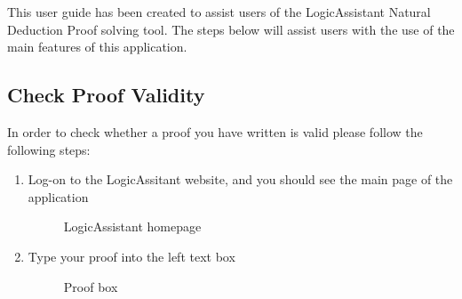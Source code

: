  
This user guide has been created to assist users of the LogicAssistant Natural Deduction Proof solving tool. The steps below will assist users with the use of the main features of this application.

\subsection{Check Proof Validity}

In order to check whether a proof you have written is valid please follow the following steps:

\begin{enumerate}
	\item Log-on to the LogicAssitant website, and you should see the main page of the application
			\begin{figure}[!ht]
				\centering
				\caption{LogicAssistant homepage}
			\end{figure}
		
		\item Type your proof into the left text box
		
			\begin{figure}[!ht]
				\centering
				\caption{Proof box}
			\end{figure}
		

\end{enumerate}
